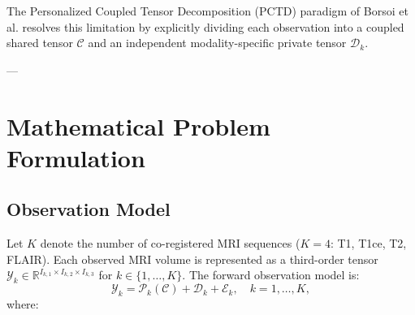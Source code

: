 \documentclass[11pt,a4paper]{article}
\begin{document}
The Personalized Coupled Tensor Decomposition (PCTD) paradigm of Borsoi et al. \cite{borsoi2024pctd} resolves this limitation by explicitly dividing each observation into a coupled shared tensor $\bm{\mathcal{C}}$ and an independent modality-specific private tensor $\bm{\mathcal{D}}_k$.

---

\section{Mathematical Problem Formulation}
\label{sec:formulation}

\subsection{Observation Model}
Let $K$ denote the number of co-registered MRI sequences ($K=4$: T1, T1ce, T2, FLAIR). Each observed MRI volume is represented as a third-order tensor $\bm{\mathcal{Y}}_k \in \mathbb{R}^{I_{k,1} \times I_{k,2} \times I_{k,3}}$ for $k \in \{1, \dots, K\}$. The forward observation model is:
\begin{equation}
\bm{\mathcal{Y}}_k = \bm{\mathcal{P}}_k(\bm{\mathcal{C}}) + \bm{\mathcal{D}}_k + \bm{\mathcal{E}}_k, \quad k = 1, \dots, K,
\label{eq:pctd_model}
\end{equation}
where:
\end{document}
